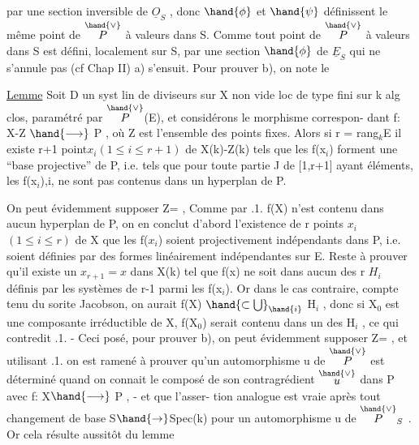 
par une section inversible de $\underline{O}_S$ , donc $\hand{\phi}$ et $\hand{\psi}$ définissent le même point
de $\overset{\hand{\vee}}{P}$ à valeurs dans S. Comme tout point de $\overset{\hand{\vee}}{P}$ à valeurs dans S est défini,
localement sur S, par une section $\hand{\phi}$ de $\underline{E}_S$ qui ne s'annule pas (cf Chap II)
a) s'ensuit.   Pour prouver b), on note le

\uline{Lemme}   Soit D un syst lin de diviseurs sur X non vide loc de type fini
sur k alg clos, paramétré par $\overset{\hand{\vee}}{P}$(E), et considérons le morphisme correspon-%
dant  f: X-Z $\hand{\longrightarrow}$ P , où Z est l'ensemble des points fixes. Alors  si
r = rang$_k$E  il existe  r+1 point$x_i$$(1\leq i\leq r+1)$ de  X(k)-Z(k)  tels que les
f(x$_i$) forment une  ``base projective'' de P, i.e. tels que  pour toute
partie J de [1,r+1] ayant   éléments,  les  f(x$_i$),i,  ne sont pas
contenus dans un hyperplan de P.

On peut évidemment supposer Z=\hand{$\emptyset$} ,   Comme par .1. f(X) n'est contenu dans
aucun hyperplan de P, on en conclut d'abord l'existence de r points
$x_i$$(1\leq i\leq r)$ de X  que les f($x_i$) soient projectivement indépendants dans P, i.e. soient définies
par des formes linéairement indépendantes sur E.   Reste à prouver qu'il
existe un  $x_{r+1} = x$   dans X(k) tel que  f(x) ne soit dans aucun des r
 $H_i$ définis par les  systèmes de r-1 parmi les f(x$_i$). Or dans
le cas contraire, compte tenu du sorite Jacobson,  on aurait
f(X) $\hand{\subset\bigcup}_{\hand{i}}$ H$_i$ , donc  si X$_0$  est une composante
irréductible de X, f(X$_0$) serait contenu dans un des H$_i$ , ce qui contredit
.1. - Ceci posé,  pour prouver b), on peut  évidemment supposer Z=\hand{$\emptyset$} ,
et utilisant .1.  on est ramené à prouver qu'un automorphisme u de $\overset{\hand{\vee}}{P}$ est
déterminé quand on connait le composé de son contragrédient $\overset{\hand{\vee}}{u}$ dans P avec f: X$\hand{\longrightarrow}$ P , - et que l'asser-%
tion analogue est vraie après tout changement de base S$\hand{\rightarrow}$Spec(k)
pour un  automorphisme u de $\overset{\hand{\vee}}{P}_S$  .  Or cela résulte aussitôt  du lemme

